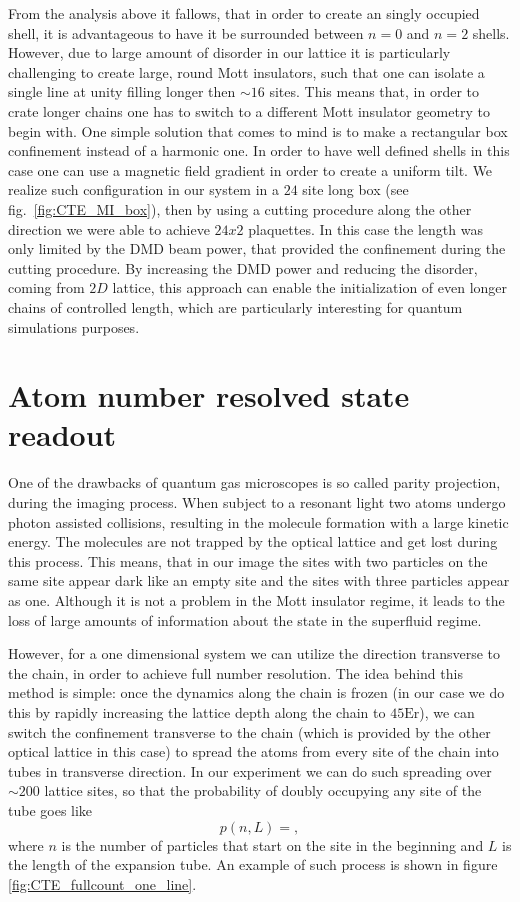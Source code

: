 From the analysis above it fallows, that in order to create an singly occupied shell, it is advantageous to have it be surrounded between $n=0$ and $n=2$ shells. However, due to large amount of disorder in our lattice it is particularly challenging to create large, round Mott insulators, such that one can isolate a single line at unity filling longer then $\sim 16$ sites. This means that, in order to crate longer chains one has to switch to a different Mott insulator geometry to begin with. One simple solution that comes to mind is to make a rectangular box confinement instead of a harmonic one. In order to have well defined shells in this case one can use a magnetic field gradient in order to create a uniform tilt. We realize such configuration in our system in a $24$ site long box (see fig.~\ref{fig:CTE_MI_box}), then by using a cutting procedure along the other direction we were able to achieve $24x2$ plaquettes. In this case the length was only limited by the DMD beam power, that provided the confinement during the cutting procedure. By increasing the DMD power and reducing the disorder, coming from $2D$ lattice, this approach can enable the initialization of even longer chains of controlled length, which are particularly interesting for quantum simulations purposes.
 
 \section{Atom number resolved state readout}
 
 One of the drawbacks of quantum gas microscopes is so called parity projection, during the imaging process. When subject to a resonant light two atoms undergo photon assisted collisions, resulting in the molecule formation with a large kinetic energy. The molecules are not trapped by the optical lattice and get lost during this process. This means, that in our image the sites with two particles on the same site appear dark like an empty site and the sites with three particles appear as one. Although it is not a problem in the Mott insulator regime, it leads to the loss of large amounts of information about the state in the superfluid regime. 
 
 However, for a one dimensional system we can utilize the direction transverse to the chain, in order to achieve full number resolution. The idea behind this method is simple: once the dynamics along the chain is frozen (in our case we do this by rapidly increasing the lattice depth along the chain to $45 \textrm{Er}$), we can switch the confinement transverse to the chain (which is provided by the other optical lattice in this case) to spread the atoms from every site of the chain into tubes in transverse direction. In our experiment we can do such spreading over $\sim 200$ lattice sites, so that the probability of doubly occupying any site of the tube goes like
 \begin{equation}
 p(n,L) = ,
 \end{equation}
 where $n$ is the number of particles that start on the site in the beginning and $L$ is the length of the expansion tube. An example of such process is shown in figure \ref{fig:CTE_fullcount_one_line}.
 
